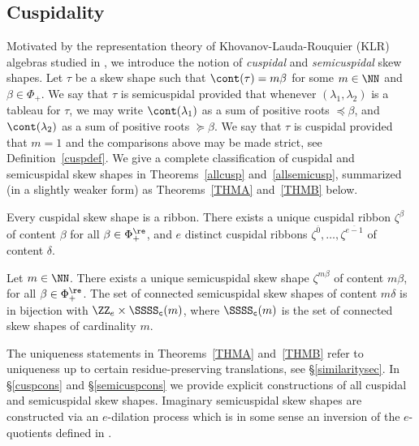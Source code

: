 \subsection{Cuspidality}\label{cuspint}
Motivated by the representation theory of Khovanov-Lauda-Rouquier (KLR) algebras studied in \cite{KlCuspSys, KlMuStrat, McNRepKLR3}, we introduce the notion of {\em cuspidal} and {\em semicuspidal} skew shapes. Let \(\tau\) be a skew shape such that \(\cont(\tau) = m \beta\) for some \(m \in \NN\) and \(\beta \in \Phi_+\). We say that \(\tau\) is semicuspidal provided that whenever \((\lambda_1, \lambda_2)\) is a tableau for \(\tau\), we may write \(\cont(\lambda_1)\) as a sum of positive roots \(\preceq \beta\), and \(\cont(\lambda_2)\) as a sum of positive roots \(\succeq \beta\). We say that \(\tau\) is cuspidal provided that \(m=1\) and the comparisons above may be made strict, see Definition~\ref{cuspdef}. 
We give a complete classification of cuspidal and semicuspidal skew shapes in Theorems~\ref{allcusp} and~\ref{allsemicusp}, summarized (in a slightly weaker form) as Theorems~\ref{THMA} and~\ref{THMB} below.

\begin{introtheorem}\label{THMA}
Every cuspidal skew shape is a ribbon.
There exists a unique cuspidal ribbon \(\zeta^\beta\) of content \(\beta\) for all \(\beta \in \Phi_+^\re\), and \(e\) distinct cuspidal ribbons \(\zeta^{\overline{0}}, \ldots, \zeta^{\overline{e-1}}\) of content \(\delta\). 
\end{introtheorem}

\begin{introtheorem}\label{THMB}
Let \(m \in \NN\).
There exists a unique semicuspidal skew shape \(\zeta^{m \beta}\) of content \(m \beta\), for all \(\beta \in \Phi_+^\re\). The set of connected semicuspidal skew shapes of content \(m \delta\) is in bijection with \(\ZZ_e \times \SSSS_{\tt c}(m)\), where \(\SSSS_{\tt c}(m)\) is the set of connected skew shapes of cardinality \(m\). 
\end{introtheorem}

The uniqueness statements in Theorems~\ref{THMA} and~\ref{THMB} refer to uniqueness up to certain residue-preserving translations, see \S\ref{similaritysec}. In \S\ref{cuspcons} and \S\ref{semicuspcons} we provide explicit constructions of all cuspidal and semicuspidal skew shapes. Imaginary semicuspidal skew shapes are constructed via an \(e\)-dilation process which is in some sense an inversion of the \(e\)-quotients defined in \cite{LittlewoodModRep}.

